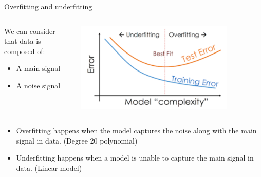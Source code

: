 \begin{frame}{Overfitting and underfitting}
\begin{columns}
    \begin{column}{0.4\textwidth}
We can consider that data is composed of:
\begin{itemize}
  \item A main signal 
  \item A noise signal
\end{itemize}
\end{column}
\begin{column}{0.6\textwidth}
\includegraphics[width=0.8\textwidth]{images/under_and_over_fitting.png}
\end{column}
\end{columns}

\begin{itemize}
  \item Overfitting happens when the model captures the noise along with the main signal in data. (Degree 20 polynomial)
  \item Underfitting happens when a model is unable to capture the main signal in data. (Linear model)
\end{itemize}
\end{frame}

